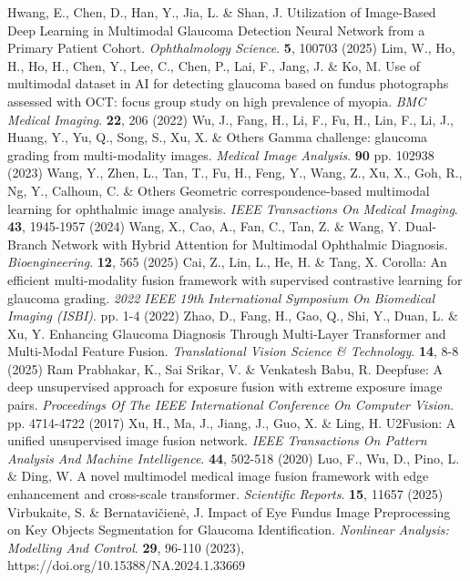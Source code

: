 \documentclass[sn-mathphys]{sn-jnl}%
\theoremstyle{thmstyleone}%
\theoremstyle{thmstyletwo}%
\theoremstyle{thmstylethree}%
\begin{document}
\begin{thebibliography}{}
    Hwang, E., Chen, D., Han, Y., Jia, L. \& Shan, J. Utilization of Image-Based Deep Learning in Multimodal Glaucoma Detection Neural Network from a Primary Patient Cohort. {\em Ophthalmology Science}. \textbf{5}, 100703 (2025)
    Lim, W., Ho, H., Ho, H., Chen, Y., Lee, C., Chen, P., Lai, F., Jang, J. \& Ko, M. Use of multimodal dataset in AI for detecting glaucoma based on fundus photographs assessed with OCT: focus group study on high prevalence of myopia. {\em BMC Medical Imaging}. \textbf{22}, 206 (2022)
    Wu, J., Fang, H., Li, F., Fu, H., Lin, F., Li, J., Huang, Y., Yu, Q., Song, S., Xu, X. \& Others Gamma challenge: glaucoma grading from multi-modality images. {\em Medical Image Analysis}. \textbf{90} pp. 102938 (2023)
    Wang, Y., Zhen, L., Tan, T., Fu, H., Feng, Y., Wang, Z., Xu, X., Goh, R., Ng, Y., Calhoun, C. \& Others Geometric correspondence-based multimodal learning for ophthalmic image analysis. {\em IEEE Transactions On Medical Imaging}. \textbf{43}, 1945-1957 (2024)
    Wang, X., Cao, A., Fan, C., Tan, Z. \& Wang, Y. Dual-Branch Network with Hybrid Attention for Multimodal Ophthalmic Diagnosis. {\em Bioengineering}. \textbf{12}, 565 (2025)
    Cai, Z., Lin, L., He, H. \& Tang, X. Corolla: An efficient multi-modality fusion framework with supervised contrastive learning for glaucoma grading. {\em 2022 IEEE 19th International Symposium On Biomedical Imaging (ISBI)}. pp. 1-4 (2022)
    Zhao, D., Fang, H., Gao, Q., Shi, Y., Duan, L. \& Xu, Y. Enhancing Glaucoma Diagnosis Through Multi-Layer Transformer and Multi-Modal Feature Fusion. {\em Translational Vision Science \& Technology}. \textbf{14}, 8-8 (2025)
    Ram Prabhakar, K., Sai Srikar, V. \& Venkatesh Babu, R. Deepfuse: A deep unsupervised approach for exposure fusion with extreme exposure image pairs. {\em Proceedings Of The IEEE International Conference On Computer Vision}. pp. 4714-4722 (2017)
    Xu, H., Ma, J., Jiang, J., Guo, X. \& Ling, H. U2Fusion: A unified unsupervised image fusion network. {\em IEEE Transactions On Pattern Analysis And Machine Intelligence}. \textbf{44}, 502-518 (2020)
    Luo, F., Wu, D., Pino, L. \& Ding, W. A novel multimodel medical image fusion framework with edge enhancement and cross-scale transformer. {\em Scientific Reports}. \textbf{15}, 11657 (2025)
    Virbukaite, S. \& Bernatavičienė, J. Impact of Eye Fundus Image Preprocessing on Key Objects Segmentation for Glaucoma Identification. {\em Nonlinear Analysis: Modelling And Control}. \textbf{29}, 96-110 (2023), https://doi.org/10.15388/NA.2024.1.33669

\end{thebibliography}
\end{document}
